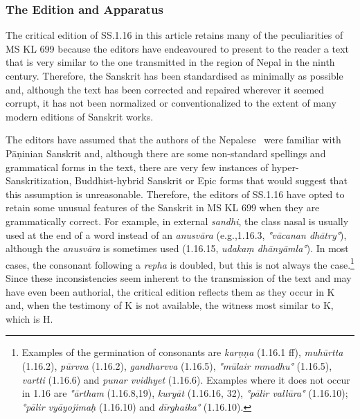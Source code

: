 \subsubsection{The Edition and Apparatus}
The critical edition of SS.1.16 in this article retains many of the peculiarities of MS KL 699 because the editors have endeavoured to present to the reader a text that is very similar to the one transmitted in the region of Nepal in the ninth century. Therefore, the Sanskrit has been standardised as minimally as possible and, although the text has been corrected and repaired wherever it seemed corrupt, it has not been normalized or conventionalized to the extent of many modern editions of Sanskrit works. 

The editors have assumed that the authors of the Nepalese \SS\ were familiar with Pāṇinian Sanskrit and, although there are some non-standard spellings and grammatical forms in the text, there are very few instances of hyper-Sanskritization, Buddhist-hybrid Sanskrit or Epic forms that would suggest that this assumption is unreasonable. Therefore, the editors of SS.1.16 have opted to retain some unusual features of the Sanskrit in MS KL 699 when they are grammatically correct. For example, in external \emph{sandhi}, the class nasal is usually used at the end of a word instead of an \emph{anusvāra} (e.g.,1.16.3, \emph{°vācanan dhātry°}), although the \emph{anusvāra} is sometimes used (1.16.15, \emph{udakaṃ dhānyāmla°}). In most cases, the consonant following a \emph{repha} is doubled, but this is not always the case.\footnote{Examples of the germination of consonants are \emph{karṇṇa} (1.16.1 ff), \emph{muhūrtta} (1.16.2), \emph{pūrvva} (1.16.2), \emph{gandharvva} (1.16.5), \emph{°mūlair mmadhu°} (1.16.5), \emph{vartti} (1.16.6) and \emph{punar vvidhyet} (1.16.6). Examples where it does not occur in 1.16 are  \emph{°ārtham} (1.16.8,19), \emph{kuryāt} (1.16.16, 32), \emph{°pālir vallūra°} (1.16.10); \emph{°pālir vyāyojimaḥ} (1.16.10) and \emph{dīrghaika°} (1.16.10).} Since these inconsistencies seem inherent to the transmission of the text and may have even been authorial, the critical edition reflects them as they occur in K and, when the testimony of K is not available, the witness most similar to K, which is H.




